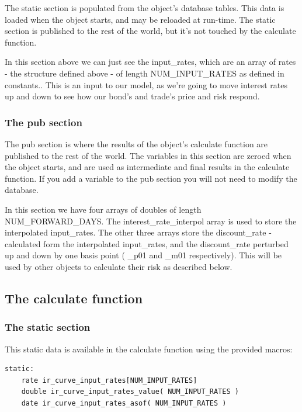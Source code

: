 \documentclass{report}
\begin{document}
The static section is populated from the object's database tables. This data is loaded when the object starts, and may be reloaded at run-time. The static section is published to the rest of the world, but it's not touched by the calculate function.

In this section above we can just see the input_rates, which are an array of rates - the structure defined above - of length NUM_INPUT_RATES as defined in constants.. This is an input to our model, as we're going to move interest rates up and down to see how our bond's and trade's price and risk respond. 

\subsubsection{The pub section}

The pub section is where the results of the object's calculate function are published to the rest of the world. The variables in this section are zeroed when the object starts, and are used as intermediate and final results in the calculate function. If you add a variable to the pub section you will not need to modify the database.

In this section we have four arrays of doubles of length NUM_FORWARD_DAYS. The interest_rate_interpol array is used to store the interpolated input_rates. The other three arrays store the discount_rate - calculated form the interpolated input_rates, and the discount_rate perturbed up and down by one basis point ( _p01 and _m01 respectively). This will be used by other objects to calculate their risk as described below.

\subsection{The calculate function}

\subsubsection{The static section}

This static data is available in the calculate function using the provided macros:

\begin{verbatim}
static:
    rate ir_curve_input_rates[NUM_INPUT_RATES]
    double ir_curve_input_rates_value( NUM_INPUT_RATES )
    date ir_curve_input_rates_asof( NUM_INPUT_RATES )
\end{verbatim}
\end{document}
